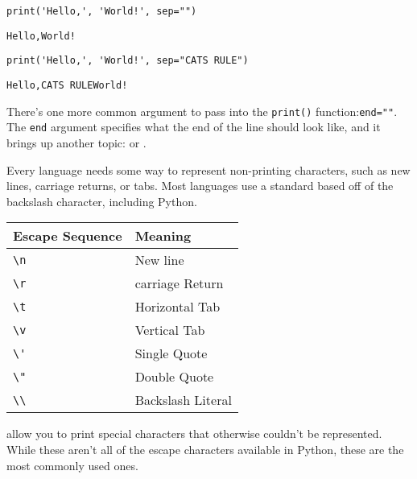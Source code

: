 \begin{lstlisting}[style=pippython]
print('Hello,', 'World!', sep="")
\end{lstlisting}
\begin{lstlisting}
Hello,World!
\end{lstlisting}
\begin{lstlisting}[style=pippython]
print('Hello,', 'World!', sep="CATS RULE")
\end{lstlisting}
\begin{lstlisting}
Hello,CATS RULEWorld!
\end{lstlisting}
There's one more common argument to pass into the \verb|print()| function:\verb|end=""|. The \verb|end| argument specifies what the end of the line should look like, and it brings up another topic:  or .\par
Every language needs some way to represent non-printing characters, such as new lines, carriage returns, or tabs. Most languages use a standard based off of the backslash character, including Python. \par
\vspace{5mm}
\begin{tabular}{|l|l|}
\hline
Escape Sequence    & Meaning                \\
\hline
\verb|\n|          & New line               \\
\hline
\verb|\r|          & carriage Return        \\
\hline
\verb|\t|          & Horizontal Tab         \\
\hline
\verb|\v|          & Vertical Tab           \\
\hline
\verb|\'|          & Single Quote           \\
\hline
\verb|\"|          & Double Quote           \\
\hline
\verb|\\|          & Backslash Literal      \\
\hline
\end{tabular}\par
\vspace{5mm}
 allow you to print special characters that otherwise couldn't be represented. While these aren't all of the escape characters available in Python, these are the most commonly used ones.\par

